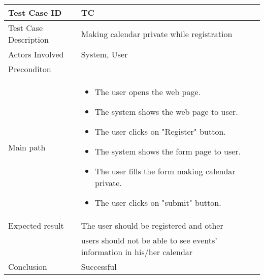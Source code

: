 \begin{center} \begin{tabular}{|l|l|}
  \hline
  Test Case ID & TC\z\\
  \hline
  Test Case Description & Making calendar private while registration\\
  \hline
  Actors Involved & System, User\\
   \hline
  Preconditon & \\
  \hline
  Main path &   \begin{minipage}{5in}
    \vskip 4pt
            \begin{itemize}
              \item The user opens the web page.
              \item The system shows the web page to user.
              \item The user clicks on "Register" button.
              \item The system shows the form page to user.
              \item The user fills the form making calendar private.
              \item The user clicks on "submit" button.
            \end{itemize}
    \vskip 4pt
  \end{minipage}  \\
  \hline
  Expected result & The user should be registered and other\\
  & users should not be able to see events' information in his/her calendar\\
  \hline
  Conclusion & Successful\\
  \hline
\end{tabular} \end{center}

